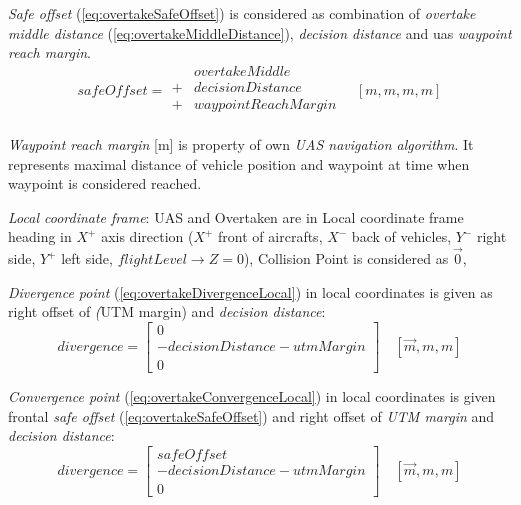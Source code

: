     \noindent \emph{Safe offset} (\ref{eq:overtakeSafeOffset}) is considered as combination of \emph{overtake middle distance} (\ref{eq:overtakeMiddleDistance}), \emph{decision distance} and uas \emph{waypoint reach margin}.
    \begin{equation}\label{eq:overtakeSafeOffset}
        safeOffset= \begin{aligned}
                        &  overtakeMiddle \\
                        +& decisionDistance \\
                        +& waypointReachMargin\\
                    \end{aligned}
                    \quad [m,m,m,m]
    \end{equation}
    
    \begin{note}
        \emph{Waypoint reach margin} [m] is property of own \emph{UAS navigation algorithm}. It represents maximal distance of vehicle position and waypoint at time when waypoint is considered reached. 
    \end{note}
    
    \noindent \emph{Local coordinate frame}: UAS and Overtaken are in Local coordinate frame heading in $X^+$ axis direction ($X^+$ front of aircrafts, $X^-$ back of vehicles, $Y^-$ right side, $Y^+$ left side, $flightLevel\to Z=0$), Collision Point is considered as $\vec{0}$,
    
    \emph{Divergence point} (\ref{eq:overtakeDivergenceLocal}) in local coordinates is given as right offset of \emph(UTM margin) and \emph{decision distance}:
    \begin{equation}\label{eq:overtakeDivergenceLocal}
        divergence= 
        \begin{bmatrix}
            0\\
            -decisionDistance - utmMargin\\
            0
        \end{bmatrix}
        \quad [\vec{m},m,m]
    \end{equation}
    
    \emph{Convergence point} (\ref{eq:overtakeConvergenceLocal}) in local coordinates is given frontal \emph{safe offset} (\ref{eq:overtakeSafeOffset}) and right offset of \emph{UTM margin} and \emph{decision distance}:
    \begin{equation}\label{eq:overtakeConvergenceLocal}
        divergence= 
        \begin{bmatrix}
            safeOffset\\
            -decisionDistance - utmMargin\\
            0
        \end{bmatrix}
        \quad [\vec{m},m,m]
    \end{equation}
    
